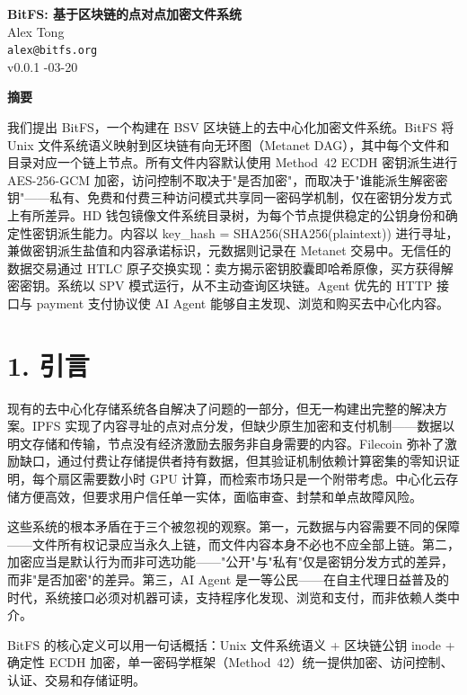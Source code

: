\documentclass[11pt,a4paper]{article}
\renewenvironment{abstract}{%
  \begin{center}
    \bfseries 摘要
  \end{center}
  \itshape
}{\par\bigskip}
\begin{document}
\begin{center}
  {\LARGE\bfseries BitFS: 基于区块链的点对点加密文件系统}\\[1.5em]
  {\large Alex Tong}\\[0.3em]
  \texttt{alex@bitfs.org}\\[0.5em]
  {\small v0.0.1 -03-20}\\[1.5em]
\end{center}

\begin{abstract}
我们提出 BitFS，一个构建在 BSV 区块链上的去中心化加密文件系统。BitFS 将 Unix 文件系统语义映射到区块链有向无环图（Metanet DAG），其中每个文件和目录对应一个链上节点。所有文件内容默认使用 Method~42 ECDH 密钥派生进行 AES-256-GCM 加密，访问控制不取决于"是否加密"，而取决于"谁能派生解密密钥"——私有、免费和付费三种访问模式共享同一密码学机制，仅在密钥分发方式上有所差异。HD 钱包镜像文件系统目录树，为每个节点提供稳定的公钥身份和确定性密钥派生能力。内容以 key\_hash = SHA256(SHA256(plaintext)) 进行寻址，兼做密钥派生盐值和内容承诺标识，元数据则记录在 Metanet 交易中。无信任的数据交易通过 HTLC 原子交换实现：卖方揭示密钥胶囊即哈希原像，买方获得解密密钥。系统以 SPV 模式运行，从不主动查询区块链。Agent 优先的 HTTP 接口与 payment 支付协议使 AI Agent 能够自主发现、浏览和购买去中心化内容。
\end{abstract}

\section{1. 引言}

现有的去中心化存储系统各自解决了问题的一部分，但无一构建出完整的解决方案。IPFS 实现了内容寻址的点对点分发，但缺少原生加密和支付机制——数据以明文存储和传输，节点没有经济激励去服务非自身需要的内容。Filecoin 弥补了激励缺口，通过付费让存储提供者持有数据，但其验证机制依赖计算密集的零知识证明，每个扇区需要数小时 GPU 计算，而检索市场只是一个附带考虑。中心化云存储方便高效，但要求用户信任单一实体，面临审查、封禁和单点故障风险。

这些系统的根本矛盾在于三个被忽视的观察。第一，元数据与内容需要不同的保障——文件所有权记录应当永久上链，而文件内容本身不必也不应全部上链。第二，加密应当是默认行为而非可选功能——"公开"与"私有"仅是密钥分发方式的差异，而非"是否加密"的差异。第三，AI Agent 是一等公民——在自主代理日益普及的时代，系统接口必须对机器可读，支持程序化发现、浏览和支付，而非依赖人类中介。

BitFS 的核心定义可以用一句话概括：Unix 文件系统语义 + 区块链公钥 inode + 确定性 ECDH 加密，单一密码学框架（Method~42）统一提供加密、访问控制、认证、交易和存储证明。
\end{document}
